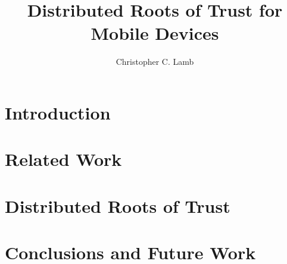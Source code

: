 \documentclass[10pt,letterpaper]{article}
\author{Christopher C. Lamb}
\title{Distributed Roots of Trust for Mobile Devices}
\begin{document}
\maketitle
\begin{abstract}

\end{abstract}

\section{Introduction}

\section{Related Work}

\section{Distributed Roots of Trust}

\section{Conclusions and Future Work}
\end{document}
